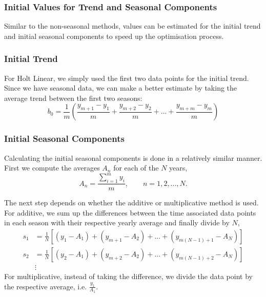 \documentclass{article}
\begin{document}
  \subsubsection{Initial Values for Trend and Seasonal Components}
  Similar to the non-seasonal methods, values can be estimated for the initial trend and initial seasonal components to speed up the optimisation process.

  \subsubsection*{Initial Trend}
  For Holt Linear, we simply used the first two data points for the initial trend. Since we have seasonal data, we can make a better estimate by taking the average trend between the first two seasons:
  \begin{equation*}
    b_0 = \frac{1}{m}\left(\frac{y_{m+1}-y_1}{m} + \frac{y_{m+2}-y_2}{m} + ... + \frac{y_{m+m}-y_m}{m}\right)
  \end{equation*}

  \subsubsection*{Initial Seasonal Components}
  Calculating the initial seasonal components is done in a relatively similar manner. First we compute the averages $A_n$ for each of the $N$ years,
  \begin{equation*}
    A_n = \frac{\sum_{i=1}^m{y_i}}{m}, \qquad n=1,2,...,N.
  \end{equation*}

  The next step depends on whether the additive or multiplicative method is used. For additive, we sum up the differences between the time associated data points in each season with their respective yearly average and finally divide by $N$,
  \begin{align*}
    s_1 &= \frac{1}{N}\left[(y_1-A_1) + (y_{m+1}-A_2) + ... + (y_{m(N-1)+1}-A_N)\right]\\
    s_2 &= \frac{1}{N}\left[(y_2-A_1) +( y_{m+2}-A_2) + ... + (y_{m(N-1)+2}-A_N)\right]\\
    &\vdots
  \end{align*}
  For multiplicative, instead of taking the difference, we divide the data point by the respective average, i.e. $\frac{y_1}{A_1}$.
\end{document}
